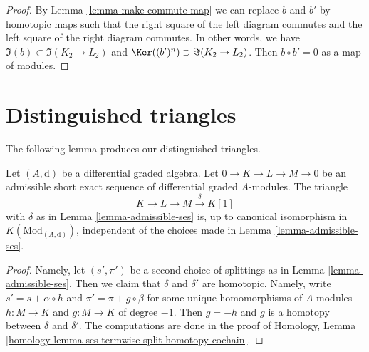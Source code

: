 \begin{proof}
By Lemma \ref{lemma-make-commute-map} we can replace $b$ and $b'$ by
homotopic maps such that the right square of the left diagram commutes
and the left square of the right diagram commutes. In other words, we have
$\Im(b) \subset \Im(K_2 \to L_2)$ and
$\Ker((b')^n) \supset \Im(K_2 \to L_2)$.
Then $b \circ b' = 0$ as a map of modules.
\end{proof}
















\section{Distinguished triangles}
\label{section-distinguished}

\noindent
The following lemma produces our distinguished triangles.

\begin{lemma}
\label{lemma-triangle-independent-splittings}
Let $(A, \text{d})$ be a differential graded algebra. Let
$0 \to K \to L \to M \to 0$ be an admissible short exact sequence
of differential graded $A$-modules. The triangle
\begin{equation}
\label{equation-triangle-associated-to-admissible-ses}
K \to L \to M \xrightarrow{\delta} K[1]
\end{equation}
with $\delta$ as in Lemma \ref{lemma-admissible-ses} is, up to canonical
isomorphism in $K(\text{Mod}_{(A, \text{d})})$, independent of the choices
made in Lemma \ref{lemma-admissible-ses}.
\end{lemma}

\begin{proof}
Namely, let $(s', \pi')$ be a second choice of splittings as in
Lemma \ref{lemma-admissible-ses}. Then we claim that $\delta$ and $\delta'$
are homotopic. Namely, write $s' = s + \alpha \circ h$ and
$\pi' = \pi + g \circ \beta$ for some unique homomorphisms
of $A$-modules $h : M \to K$ and $g : M \to K$ of degree $-1$.
Then $g = -h$ and $g$ is a homotopy between $\delta$ and $\delta'$.
The computations are done in the proof of
Homology, Lemma \ref{homology-lemma-ses-termwise-split-homotopy-cochain}.
\end{proof}

